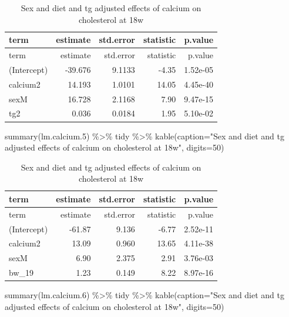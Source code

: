 \documentclass[
]{article}
\newenvironment{Shaded}{\begin{snugshade}}{\end{snugshade}}
\newcommand{\AttributeTok}[1]{\textcolor[rgb]{0.77,0.63,0.00}{#1}}
\newcommand{\DecValTok}[1]{\textcolor[rgb]{0.00,0.00,0.81}{#1}}
\newcommand{\FloatTok}[1]{\textcolor[rgb]{0.00,0.00,0.81}{#1}}
\newcommand{\FunctionTok}[1]{\textcolor[rgb]{0.00,0.00,0.00}{#1}}
\newcommand{\NormalTok}[1]{#1}
\newcommand{\SpecialCharTok}[1]{\textcolor[rgb]{0.00,0.00,0.00}{#1}}
\newcommand{\StringTok}[1]{\textcolor[rgb]{0.31,0.60,0.02}{#1}}
\begin{document}
\begin{longtable}[]{@{}lrrrr@{}}
\caption{Sex and diet and tg adjusted effects of calcium on cholesterol
at 18w}\tabularnewline
\toprule()
term & estimate & std.error & statistic & p.value \\
\midrule()
\endfirsthead
\toprule()
term & estimate & std.error & statistic & p.value \\
\midrule()
\endhead
(Intercept) & -39.676 & 9.1133 & -4.35 & 1.52e-05 \\
calcium2 & 14.193 & 1.0101 & 14.05 & 4.45e-40 \\
sexM & 16.728 & 2.1168 & 7.90 & 9.47e-15 \\
tg2 & 0.036 & 0.0184 & 1.95 & 5.10e-02 \\
\bottomrule()
\end{longtable}

\begin{Shaded}
\begin{Highlighting}[]
\FunctionTok{summary}\NormalTok{(lm.calcium}\FloatTok{.5}\NormalTok{) }\SpecialCharTok{\%\textgreater{}\%}\NormalTok{ tidy }\SpecialCharTok{\%\textgreater{}\%} \FunctionTok{kable}\NormalTok{(}\AttributeTok{caption=}\StringTok{"Sex and diet and tg adjusted effects of calcium on cholesterol at 18w"}\NormalTok{, }\AttributeTok{digits=}\DecValTok{50}\NormalTok{)}
\end{Highlighting}
\end{Shaded}

\begin{longtable}[]{@{}lrrrr@{}}
\caption{Sex and diet and tg adjusted effects of calcium on cholesterol
at 18w}\tabularnewline
\toprule()
term & estimate & std.error & statistic & p.value \\
\midrule()
\endfirsthead
\toprule()
term & estimate & std.error & statistic & p.value \\
\midrule()
\endhead
(Intercept) & -61.87 & 9.136 & -6.77 & 2.52e-11 \\
calcium2 & 13.09 & 0.960 & 13.65 & 4.11e-38 \\
sexM & 6.90 & 2.375 & 2.91 & 3.76e-03 \\
bw\_19 & 1.23 & 0.149 & 8.22 & 8.97e-16 \\
\bottomrule()
\end{longtable}

\begin{Shaded}
\begin{Highlighting}[]
\FunctionTok{summary}\NormalTok{(lm.calcium}\FloatTok{.6}\NormalTok{) }\SpecialCharTok{\%\textgreater{}\%}\NormalTok{ tidy }\SpecialCharTok{\%\textgreater{}\%} \FunctionTok{kable}\NormalTok{(}\AttributeTok{caption=}\StringTok{"Sex and diet and tg adjusted effects of calcium on cholesterol at 18w"}\NormalTok{, }\AttributeTok{digits=}\DecValTok{50}\NormalTok{)}
\end{Highlighting}
\end{Shaded}
\end{document}
